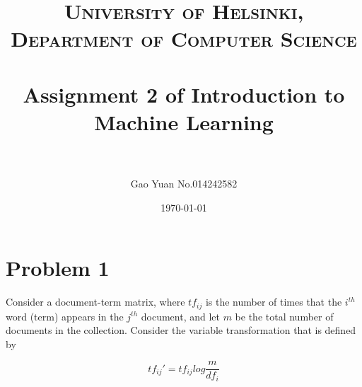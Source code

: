 \documentclass[paper=a4, fontsize=11pt]{scrartcl} %
\title{	
\normalfont \normalsize 
\textsc{University of Helsinki, Department of Computer Science} \\ [25pt] %
\horrule{0.5pt} \\[0.4cm] %
\huge Assignment 2 of Introduction to Machine Learning \\ %
\horrule{2pt} \\[0.5cm] %
}
\author{Gao Yuan No.014242582} %
\date{\normalsize\today} %
\numberwithin{equation}{section} %
\numberwithin{figure}{section} %
\numberwithin{table}{section} %
\begin{document}
\maketitle %


\section{Problem 1}

Consider a document-term matrix, where $tf_{ij}$ is the number of times that the $i^{th}$ word (term) appears in the $j^{th}$ document, and let $m$ be the total number of documents in the collection. Consider the variable transformation that is defined by 

$$ tf_{ij}' = tf_{ij}log\frac{m}{df_i}$$
\end{document}
